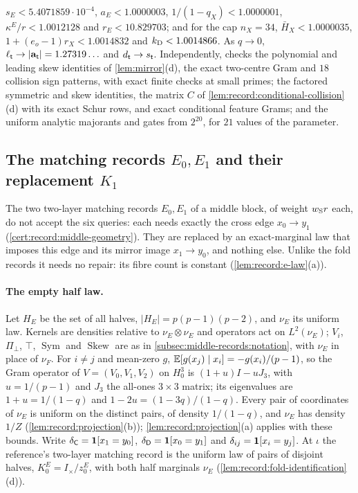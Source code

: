 \begin{certificate}
$s_E<5.4071859\cdot10^{-4}$, $a_E<1.0000003$, $1/(1-q_X)<1.0000001$,
$\kappa^E/r<1.0012128$ and $r_E<10.829703$; and for the cap $n_X=34$,
$\bar H_X<1.0000035$, $1+(e_o-1)r_X<1.0014832$ and $k_{\rm D}<1.0014866$. As
$q\to0$, $\ell_\mathsf t\to|\mathbf a_\mathsf t|=1.27319\ldots$ and $d_\mathsf t\to s_\mathsf t$.
Independently,  checks the
polynomial and leading skew identities of \cref{lem:mirror}(d), the exact
two-centre Gram and $18$ collision sign patterns, with exact finite checks at
small primes;  the
factored symmetric and skew identities, the matrix $C$ of
\cref{lem:record:conditional-collision}(d) with its exact Schur rows, and exact
conditional feature Grams; and
 the uniform analytic
majorants and gates from $2^{20}$, for $21$ values of the parameter.
\end{certificate}

\subsection{The matching records \texorpdfstring{$E_0,E_1$}{E\_0,E\_1} and their replacement \texorpdfstring{$K_1$}{K\_1}}\label{subsec:record:e_side}

The two two-layer matching records $E_0,E_1$ of a middle block, of weight
$w_{\rm S}r$ each, do not accept the six queries: each needs exactly the cross
edge $x_0\to y_1$ (\cref{cert:record:middle-geometry}). They are replaced by an
exact-marginal law that imposes this edge and its mirror image $x_1\to y_0$, and
nothing else. Unlike the fold records it needs no repair: its fibre count is
constant (\cref{lem:record:e-law}(a)).

\paragraph{The empty half law.}
Let $H_E$ be the set of all halves, $|H_E|=p(p-1)(p-2)$, and $\nu_E$ its uniform
law. Kernels are densities relative to $\nu_E\otimes\nu_E$ and operators act on
$L^2(\nu_E)$; $V_i$, $\Pi_\perp$, $\top$, $\operatorname{Sym}$ and
$\operatorname{Skew}$ are as in \cref{subsec:middle-records:notation}, with $\nu_E$
in place of $\nu_F$. For $i\ne j$ and mean-zero $g$, $\mathbb E[g(x_j)\mid x_i]=-g(x_i)/(p-1)$,
so the Gram operator of $V=(V_0,V_1,V_2)$ on $H_0^3$ is $(1+u)I-uJ_3$, with
$u=1/(p-1)$ and $J_3$ the all-ones $3\times3$ matrix; its eigenvalues are
$1+u=1/(1-q)$ and $1-2u=(1-3q)/(1-q)$. Every pair of coordinates of $\nu_E$ is
uniform on the distinct pairs, of density $1/(1-q)$, and $\nu_E$ has density
$1/Z$ (\cref{lem:record:projection}(b)); \cref{lem:record:projection}(a)
applies with these bounds. Write
$\delta_{\mathsf C}=\mathbf 1[x_1=y_0]$, $\delta_{\mathsf D}=\mathbf 1[x_0=y_1]$ and
$\delta_{ij}=\mathbf 1[x_i=y_j]$. At $\iota$ the reference's two-layer matching record
is the uniform law of pairs of disjoint halves, $K^E_0=I_\times/z^E_0$, with both
half marginals $\nu_E$ (\cref{lem:record:fold-identification}(d)).

